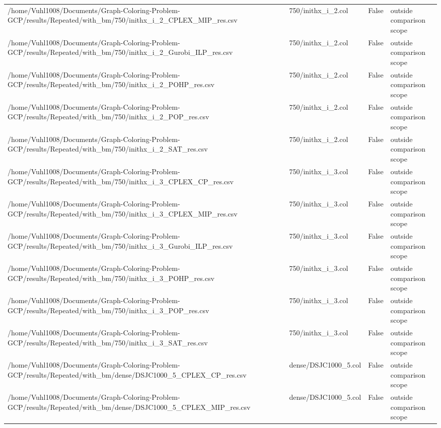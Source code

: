 \begin{table}[htbp]
\begin{tabular}{llll}
/home/Vuhl1008/Documents/Graph-Coloring-Problem-GCP/results/Repeated/with\_bm/750/inithx\_i\_2\_CPLEX\_MIP\_res.csv & 750/inithx\_i\_2.col & False & outside comparison scope \\
/home/Vuhl1008/Documents/Graph-Coloring-Problem-GCP/results/Repeated/with\_bm/750/inithx\_i\_2\_Gurobi\_ILP\_res.csv & 750/inithx\_i\_2.col & False & outside comparison scope \\
/home/Vuhl1008/Documents/Graph-Coloring-Problem-GCP/results/Repeated/with\_bm/750/inithx\_i\_2\_POHP\_res.csv & 750/inithx\_i\_2.col & False & outside comparison scope \\
/home/Vuhl1008/Documents/Graph-Coloring-Problem-GCP/results/Repeated/with\_bm/750/inithx\_i\_2\_POP\_res.csv & 750/inithx\_i\_2.col & False & outside comparison scope \\
/home/Vuhl1008/Documents/Graph-Coloring-Problem-GCP/results/Repeated/with\_bm/750/inithx\_i\_2\_SAT\_res.csv & 750/inithx\_i\_2.col & False & outside comparison scope \\
/home/Vuhl1008/Documents/Graph-Coloring-Problem-GCP/results/Repeated/with\_bm/750/inithx\_i\_3\_CPLEX\_CP\_res.csv & 750/inithx\_i\_3.col & False & outside comparison scope \\
/home/Vuhl1008/Documents/Graph-Coloring-Problem-GCP/results/Repeated/with\_bm/750/inithx\_i\_3\_CPLEX\_MIP\_res.csv & 750/inithx\_i\_3.col & False & outside comparison scope \\
/home/Vuhl1008/Documents/Graph-Coloring-Problem-GCP/results/Repeated/with\_bm/750/inithx\_i\_3\_Gurobi\_ILP\_res.csv & 750/inithx\_i\_3.col & False & outside comparison scope \\
/home/Vuhl1008/Documents/Graph-Coloring-Problem-GCP/results/Repeated/with\_bm/750/inithx\_i\_3\_POHP\_res.csv & 750/inithx\_i\_3.col & False & outside comparison scope \\
/home/Vuhl1008/Documents/Graph-Coloring-Problem-GCP/results/Repeated/with\_bm/750/inithx\_i\_3\_POP\_res.csv & 750/inithx\_i\_3.col & False & outside comparison scope \\
/home/Vuhl1008/Documents/Graph-Coloring-Problem-GCP/results/Repeated/with\_bm/750/inithx\_i\_3\_SAT\_res.csv & 750/inithx\_i\_3.col & False & outside comparison scope \\
/home/Vuhl1008/Documents/Graph-Coloring-Problem-GCP/results/Repeated/with\_bm/dense/DSJC1000\_5\_CPLEX\_CP\_res.csv & dense/DSJC1000\_5.col & False & outside comparison scope \\
/home/Vuhl1008/Documents/Graph-Coloring-Problem-GCP/results/Repeated/with\_bm/dense/DSJC1000\_5\_CPLEX\_MIP\_res.csv & dense/DSJC1000\_5.col & False & outside comparison scope \\

\end{tabular}
\end{table}
